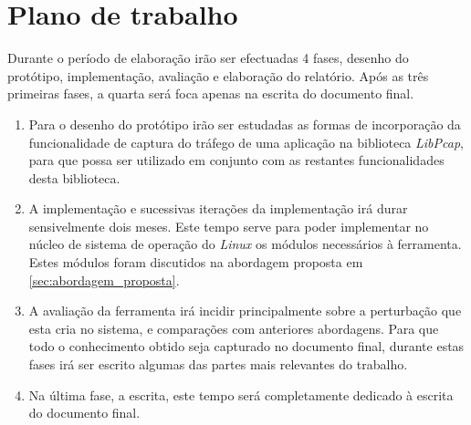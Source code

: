 \chapter[Plano de trabalho]{Plano de trabalho} \label{cap:plano}



% 
% 
% 
% 
% 
% 

Durante o período de elaboração irão ser efectuadas 4 fases, desenho do protótipo, implementação, avaliação e elaboração do relatório. Após as três primeiras fases, a quarta será foca apenas na escrita do documento final. 
\begin{enumerate}

\item Para o desenho do protótipo irão ser estudadas as formas de incorporação da funcionalidade de captura do tráfego de uma aplicação na biblioteca \textit{LibPcap}, para que possa ser utilizado em conjunto com as restantes funcionalidades desta biblioteca. 

\item A implementação e sucessivas iterações da implementação irá durar sensivelmente dois meses. Este tempo serve para poder implementar no núcleo de sistema de operação do \textit{Linux} os módulos necessários à ferramenta. Estes módulos foram discutidos na abordagem proposta em \ref{sec:abordagem_proposta}. 

\item A avaliação da ferramenta irá incidir principalmente sobre a perturbação que esta cria no sistema, e comparações com anteriores abordagens. Para que todo o conhecimento obtido seja capturado no documento final, durante estas fases irá ser escrito algumas das partes mais relevantes do trabalho. 

\item Na última fase, a escrita, este tempo será completamente dedicado à escrita do documento final. 

\end{enumerate}

